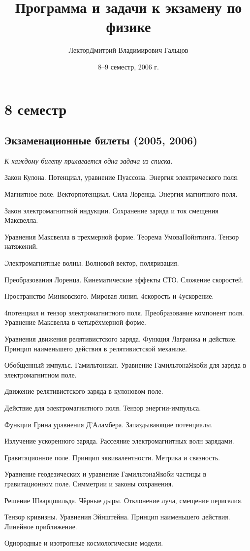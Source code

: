 \documentclass[a4paper,draft]{article}
\title{Программа и задачи к экзамену по физике}
\author{Лектор\т Дмитрий Владимирович Гальцов}
\date{8--9 семестр, 2006 г.}
\begin{document}
\maketitle

\section{8 семестр}

\subsection{Экзаменационные билеты (2005, 2006)}

\emph{К каждому билету прилагается одна задача из списка.}

\begin{nums}{-2}
\item Закон Кулона. Потенциал, уравнение Пуассона. Энергия электрического поля.
\item Магнитное поле. Вектор\д потенциал. Сила Лоренца. Энергия магнитного поля.
\item Закон электромагнитной индукции. Сохранение заряда и ток смещения Максвелла.
\item Уравнения Максвелла в трехмерной форме. Теорема Умова\ч Пойнтинга. Тензор натяжений.
\item Электромагнитные волны. Волновой вектор, поляризация.
\item Преобразования Лоренца. Кинематические эффекты СТО. Сложение скоростей.
\item Пространство Минковского. Мировая линия, 4\д скорость и 4\д ускорение.
\item 4\д потенциал и тензор электромагнитного поля. Преобразование компонент поля. Уравнение Максвелла в четырёхмерной форме.
\item Уравнения движения релятивистского заряда. Функция Лагранжа и действие. Принцип наименьшего действия в релятивистской механике.
\item Обобщенный импульс. Гамильтониан. Уравнение Гамильтона\ч Якоби для заряда в электромагнитном поле.
\item Движение релятивистского заряда в кулоновом поле.
\item Действие для электромагнитного поля. Тензор энергии-импульса.
\item Функции Грина уравнения Д'Аламбера. Запаздывающие потенциалы.
\item Излучение ускоренного заряда. Рассеяние электромагнитных волн зарядами.
\item Гравитационное поле. Принцип эквивалентности. Метрика и связность.
\item Уравнение геодезических и уравнение Гамильтона\ч Якоби частицы в гравитационном поле. Симметрии и законы сохранения.
\item Решение Шварцшильда. Чёрные дыры. Отклонение луча, смещение перигелия.
\item Тензор кривизны. Уравнения Эйнштейна. Принцип наименьшего действия. Линейное приближение.
\item Однородные и изотропные космологические модели.
\end{nums}
\end{document}
